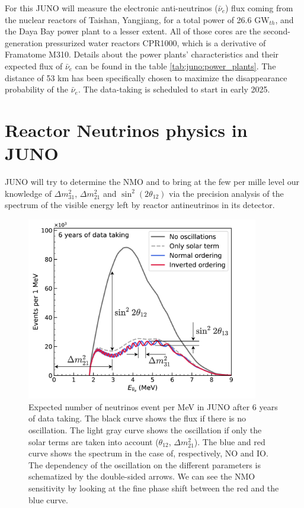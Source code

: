 \documentclass[../main.tex]{subfiles}
\begin{document}
For this JUNO will measure the electronic anti-neutrinos ($\bar{\nu}_e$) flux coming from the nuclear reactors of Taishan, Yangjiang, for a total power of 26.6 GW$_{th}$, and the Daya Bay power plant to a lesser extent. All of those cores are the second-generation pressurized water reactors CPR1000, which is a derivative of Framatome M310. Details about the power plants' characteristics and their expected flux of $\bar{\nu}_e$ can be found in the table \ref{tab:juno:power_plants}.
The distance of 53 km has been specifically chosen to maximize the disappearance probability of the $\bar{\nu}_e$. The data-taking is scheduled to start in early 2025.

\section{Reactor Neutrinos physics in JUNO}

JUNO will try to determine the NMO and to bring at the few per mille level our knowledge of $\Delta m^2_{31}$,  $\Delta m^2_{21}$ and $\sin^2(2\theta_{12})$  via the precision analysis of the spectrum of the visible energy left by reactor antineutrinos in its detector.

\begin{figure}
  \centering
  \includegraphics[height=8cm]{images/juno/Spectrum-OscillationsOnly_dm2_31.png}
  \caption{Expected number of neutrinos event per MeV in JUNO after 6 years of data taking. The black curve shows the flux if there is no oscillation. The light gray curve shows the oscillation if only the solar terms are taken into account ($\theta_{12}$, $\Delta m_{21}^2$). The blue and red curve shows the spectrum in the case of, respectively, NO and IO. The dependency of the oscillation on the different parameters is schematized by the double-sided arrows. We can see the NMO sensitivity by looking at the fine phase shift between the red and the blue curve.}
  \label{fig:juno:juno-spectrum-oscillation}
\end{figure}
\end{document}
